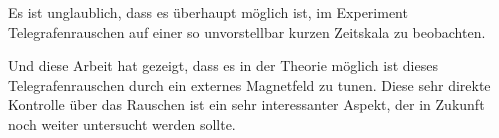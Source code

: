 \documentclass[main.tex]{subfiles}
\begin{document}
Es ist unglaublich, dass es überhaupt möglich ist, im Experiment Telegrafenrauschen auf einer so unvorstellbar kurzen Zeitskala zu beobachten. 

Und diese Arbeit hat gezeigt, dass es in der Theorie möglich ist dieses Telegrafenrauschen durch ein externes Magnetfeld zu tunen. Diese sehr direkte Kontrolle über das Rauschen ist ein sehr interessanter Aspekt, der in Zukunft noch weiter untersucht werden sollte.
\end{document}
